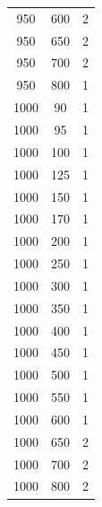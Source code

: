 \begin{longtable}{c c c}
950 & 600 & 2 \\
950 & 650 & 2 \\
950 & 700 & 2 \\
950 & 800 & 1 \\
1000 & 90 & 1 \\
1000 & 95 & 1 \\
1000 & 100 & 1 \\
1000 & 125 & 1 \\
1000 & 150 & 1 \\
1000 & 170 & 1 \\
1000 & 200 & 1 \\
1000 & 250 & 1 \\
1000 & 300 & 1 \\
1000 & 350 & 1 \\
1000 & 400 & 1 \\
1000 & 450 & 1 \\
1000 & 500 & 1 \\
1000 & 550 & 1 \\
1000 & 600 & 1 \\
1000 & 650 & 2 \\
1000 & 700 & 2 \\
1000 & 800 & 2 \\
\end{longtable}

